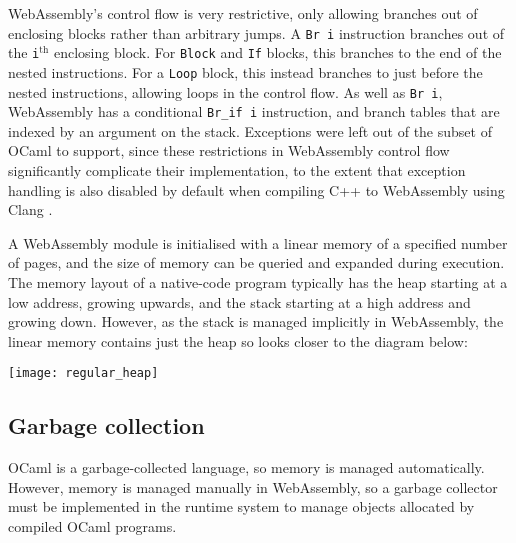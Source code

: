 WebAssembly's control flow is very restrictive, only allowing branches out of enclosing blocks rather than arbitrary jumps. A \verb|Br i| instruction branches
out of the \verb|i|$^{\text{th}}$ enclosing block. For \verb|Block| and \verb|If| blocks, this branches to the end of the nested instructions. For a \verb|Loop| block, this instead branches to just before the nested instructions, allowing loops in the control flow. %
As well as \verb|Br i|, WebAssembly has a conditional \verb|Br_if i| instruction, and branch tables that are indexed by an argument on the stack. Exceptions were left out of the subset of OCaml to support, since these restrictions in WebAssembly control flow significantly complicate their implementation, to the extent that exception handling is also disabled by default when compiling C++ to WebAssembly using Clang \cite{wasm-exceptions}.


A WebAssembly module is initialised with a linear memory of a specified number of pages, and the size of memory can be queried and expanded during execution.
The memory layout of a native-code program typically has the heap starting at a low address, growing upwards, and the stack starting at a high address and growing down. However, as the stack is managed implicitly in WebAssembly, the linear memory contains just the heap so looks closer to the diagram below:


\texttt{[image: regular\_heap]}

\subsection{Garbage collection}
OCaml is a garbage-collected language, so memory is managed automatically. However, memory is managed manually in WebAssembly, so a garbage collector must be implemented in the runtime system to manage objects allocated by compiled OCaml programs.


